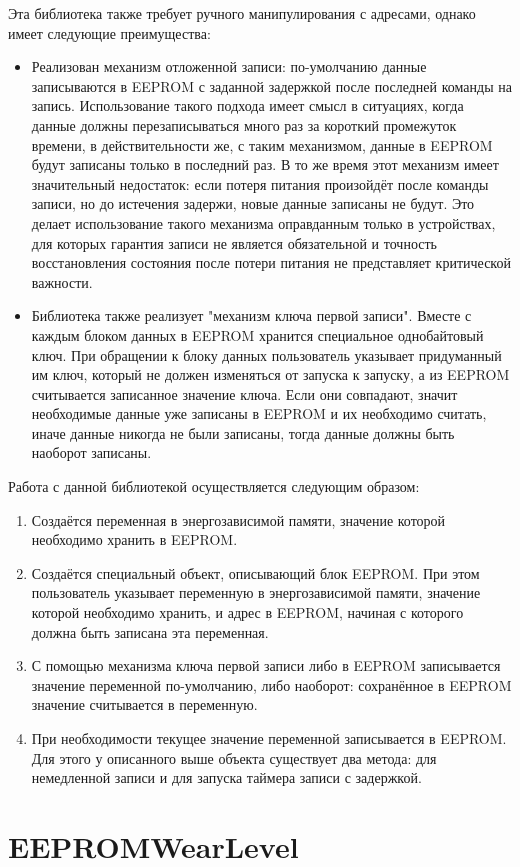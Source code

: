 Эта библиотека также требует ручного манипулирования с адресами, однако имеет следующие преимущества:
\begin{itemize}
	\item Реализован механизм отложенной записи: по-умолчанию данные записываются в EEPROM с заданной задержкой после последней команды на запись. Использование такого подхода имеет смысл в ситуациях, когда данные должны перезаписываться много раз за короткий промежуток времени, в действительности же, с таким механизмом, данные в EEPROM будут записаны только в последний раз. В то же время этот механизм имеет значительный недостаток: если потеря питания произойдёт после команды записи, но до истечения задержи, новые данные записаны не будут. Это делает использование такого механизма оправданным только в устройствах, для которых гарантия записи не является обязательной и точность восстановления состояния после потери питания не представляет критической важности.
	\item Библиотека также реализует "механизм ключа первой записи". Вместе с каждым блоком данных в EEPROM хранится специальное однобайтовый ключ. При обращении к блоку данных пользователь указывает придуманный им ключ, который не должен изменяться от запуска к запуску, а из EEPROM считывается записанное значение ключа. Если они совпадают, значит необходимые данные уже записаны в EEPROM и их необходимо считать, иначе данные никогда не были записаны, тогда данные должны быть наоборот записаны.
\end{itemize}

Работа с данной библиотекой осуществляется следующим образом:
\begin{enumerate}
	\item Создаётся переменная в энергозависимой памяти, значение которой необходимо хранить в EEPROM.
	\item Создаётся специальный объект, описывающий блок EEPROM. При этом пользователь указывает переменную в энергозависимой памяти, значение которой  необходимо хранить, и адрес в EEPROM, начиная с которого должна быть записана эта переменная.
	\item С помощью механизма ключа первой записи либо в EEPROM записывается значение переменной по-умолчанию, либо наоборот: сохранённое в EEPROM значение считывается в переменную.
	\item При необходимости текущее значение переменной записывается в EEPROM. Для этого у описанного выше объекта существует два метода: для немедленной записи и для запуска таймера записи с задержкой.
\end{enumerate}


\section{EEPROMWearLevel}

